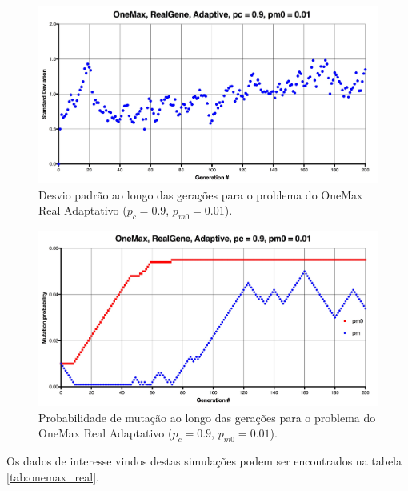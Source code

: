 \begin{figure}[ht!]
    \centering \includegraphics[width=1.0\textwidth]{onemax_real_adaptive_std.jpg}
    \caption{Desvio padrão ao longo das gerações para o problema do OneMax Real Adaptativo ($p_c=0.9$, $p_{m0}=0.01$).}
    \label{fig:onemax_real_adaptive_std}
\end{figure}

\begin{figure}[ht!]
    \centering \includegraphics[width=1.0\textwidth]{onemax_real_adaptive_pm.jpg}
    \caption{Probabilidade de mutação ao longo das gerações para o problema do OneMax Real Adaptativo ($p_c=0.9$, $p_{m0}=0.01$).}
    \label{fig:onemax_real_adaptive_pm}
\end{figure}

Os dados de interesse vindos destas simulações podem ser encontrados na tabela  \ref{tab:onemax_real}.

